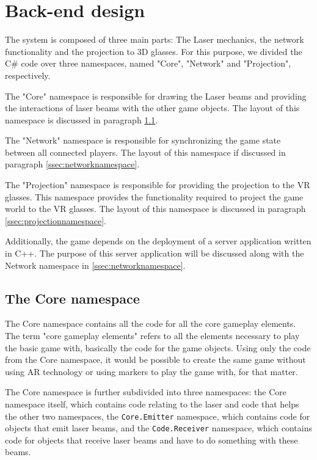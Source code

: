 	\section{Back-end design} \label{sec:backenddesign}
		The system is composed of three main parts: The Laser mechanics, the network
		functionality and the projection to 3D glasses. For this purpose, we divided
		the C\# code over three namespaces, named "Core", "Network" and
		"Projection", respectively.

		The "Core" namespace is responsible for drawing the Laser beams and
		providing the interactions of laser beams with the other game objects.
		The layout of this namespace is discussed in paragraph 
		\ref{ssec:corenamespace}.

		The "Network" namespace is responsible for synchronizing the game state
		between all connected players. The layout of this namespace if discussed 
		in paragraph \ref{ssec:networknamespace}.

		The "Projection" namespace is responsible for providing the projection to
		the VR glasses. This namespace provides the functionality required to project
		the game world to the VR glasses. The layout of this namespace is discussed in
		paragraph \ref{ssec:projectionnamespace}.
		
		Additionally, the game depends on the deployment of a server application
		written in C++. The purpose of this server application will be discussed 
		along with the Network namespace in \ref{ssec:networknamespace}.
		
		\subsection{The Core namespace} \label{ssec:corenamespace}
			The Core namespace contains all the code for all the core gameplay
			elements. The term "core gameplay elements" refers to all the
			elements necessary to play the basic game with, basically the code
			for the game objects. Using only the code from the Core namespace,
			it would be possible to create the same game without using AR
			technology or using markers to play the game with, for that matter.
			
			The Core namespace is further subdivided into three namespaces:
			the Core namespace itself, which contains code relating to the laser
			and code that helps the other two namespaces, the 
			\texttt{Core.Emitter} namespace, which contains code for objects 
			that emit laser beams, and the \texttt{Code.Receiver} namespace, 
			which contains code for objects that receive laser beams and have to 
			do something with these beams.
			
